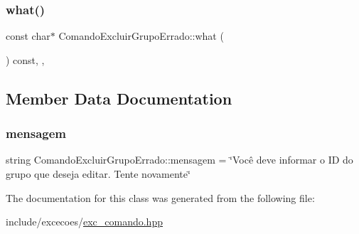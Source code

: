 \subsubsection{\texorpdfstring{what()}{what()}}
{\footnotesize\ttfamily const char$\ast$ Comando\+Excluir\+Grupo\+Errado\+::what (\begin{DoxyParamCaption}{ }\end{DoxyParamCaption}) const\hspace{0.3cm}{\ttfamily [inline]}, {\ttfamily [override]}, {\ttfamily [noexcept]}}



\subsection{Member Data Documentation}
\mbox{\label{classComandoExcluirGrupoErrado_a3d55ba220737df2b3a454360ca1c7513}} 
\subsubsection{\texorpdfstring{mensagem}{mensagem}}
{\footnotesize\ttfamily string Comando\+Excluir\+Grupo\+Errado\+::mensagem = \char`\"{}Você deve informar o ID do grupo que deseja editar. Tente novamente\char`\"{}\hspace{0.3cm}{\ttfamily [private]}}



The documentation for this class was generated from the following file\+:\begin{DoxyCompactItemize}
\item 
include/excecoes/\hyperlink{exc__comando_8hpp}{exc\+\_\+comando.\+hpp}\end{DoxyCompactItemize}
